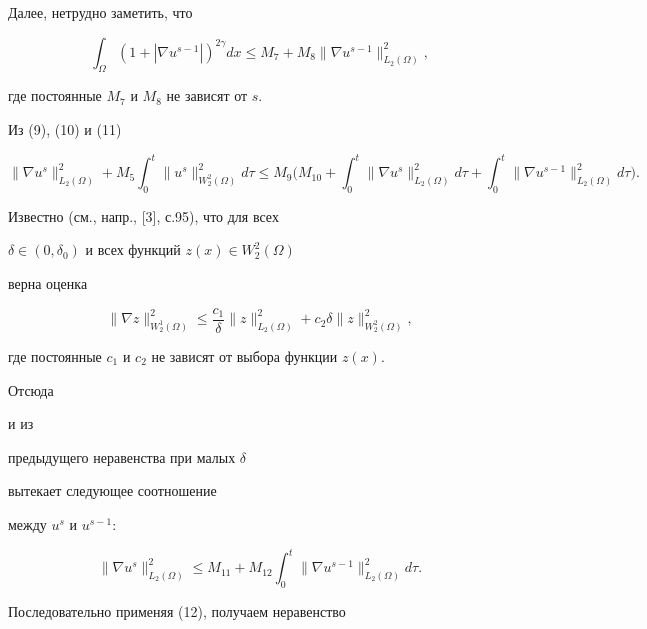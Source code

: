 \begin{pf}
Далее, нетрудно заметить, что


\begin{equation}


\int_\Omega(1+|\nabla u^{s-1}|)^{2\gamma}dx\le


M_7+M_8\|\nabla u^{s-1}\|^2_{L_2(\Omega)},


\end{equation}


где постоянные $M_7$ и $M_8$ не зависят от $s$.


Из (9), (10) и (11)


$$


\|\nabla u^s\|^2_{L_2(\Omega)}+M_5\int^t_0


\|u^s\|^2_{W^2_2(\Omega)}d\tau\le


M_9\biggl(M_{10}+\int^t_0\|\nabla u^s\|^2_{L_2(\Omega)}d\tau+


\int^t_0\|\nabla u^{s-1}\|^2_{L_2(\Omega)}d\tau\biggr).


$$





Известно (см., напр., [3], с.95), что для всех


$\delta\in(0,\delta_0)$ и всех функций $z(x)\in W^2_2(\Omega)$


верна оценка


$$


\|\nabla z\|^2_{W^1_2(\Omega)}\le\frac{c_1}{\delta}


\|z\|^2_{L_2(\Omega)}+c_2\delta


\|z\|^2_{W^2_2(\Omega)},


$$


где постоянные $c_1$ и $c_2$ не зависят от выбора функции $z(x)$.


Отсюда


и из


предыдущего неравенства при малых $\delta$


вытекает следующее соотношение


между $u^s$ и $u^{s-1}$:


\begin{equation}


\|\nabla u^s\|^2_{L_2(\Omega)}\le M_{11}+M_{12}


\int^t_0\|\nabla u^{s-1}\|^2_{L_2(\Omega)}d\tau.


\end{equation}


Последовательно применяя (12), получаем неравенство



\end{pf}
